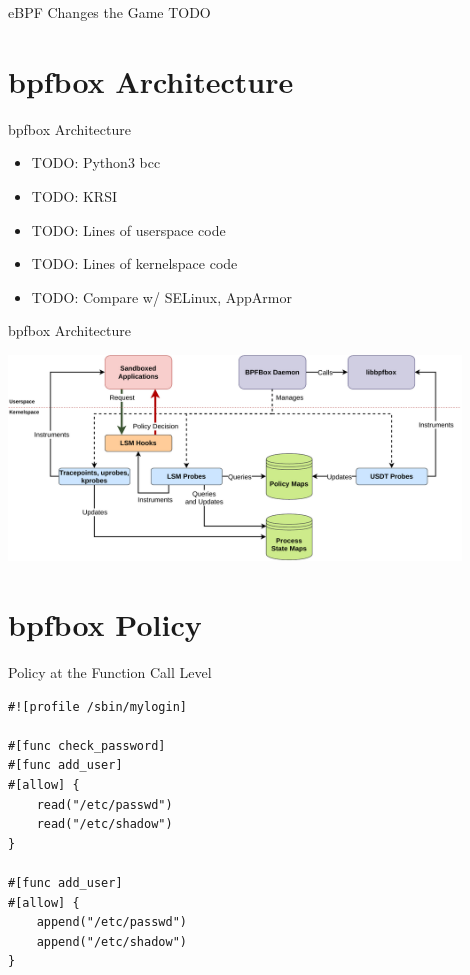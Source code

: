 \documentclass[12pt, dvipsnames]{beamer}
\begin{document}

\begin{frame}[t]{eBPF Changes the Game}
TODO
\end{frame}

\section{bpfbox Architecture}

\begin{frame}[t]{bpfbox Architecture}
\begin{itemize}
    \item TODO: Python3 bcc
    \item TODO: KRSI
    \item TODO: Lines of userspace code
    \item TODO: Lines of kernelspace code
    \item TODO: Compare w/ SELinux, AppArmor
\end{itemize}
\end{frame}

\begin{frame}[t]{bpfbox Architecture}
\vfill
\begin{center}
    \color{black}
    \includegraphics[width=0.9\textwidth]{figs/bpfbox-overview.pdf}
\end{center}
\vfill
\end{frame}

\section{bpfbox Policy}

\begin{frame}[c, fragile]{Policy at the Function Call Level}
\begin{lstlisting}[language=bpfbox]
#![profile /sbin/mylogin]

#[func check_password]
#[func add_user]
#[allow] {
    read("/etc/passwd")
    read("/etc/shadow")
}

#[func add_user]
#[allow] {
    append("/etc/passwd")
    append("/etc/shadow")
}
\end{lstlisting}
\end{frame}
\end{document}
